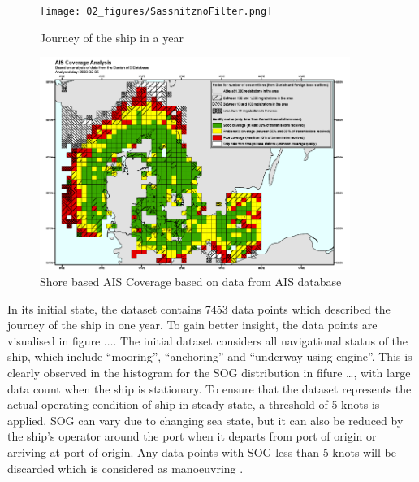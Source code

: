 \begin{figure}
    \centering
        \texttt{[image: 02\_figures/SassnitznoFilter.png]}
        \caption{Journey of the ship in a year}
        \label{fig:YearJourney}
\end{figure}

\begin{figure}
    \centering
        \includegraphics[width=0.9\textwidth]{02_figures/AIS_Coverage.png}
        \caption{Shore based AIS Coverage based on data from AIS database \cite{webaisdk.2023}}
        \label{fig:aiscoverage}
\end{figure}

In its initial state, the dataset contains 7453 data points which described the journey of the ship in one year. To gain better insight, the data points are visualised in figure $\dots$. The initial dataset considers all navigational status of the ship, which include ``mooring'', ``anchoring'' and ``underway using engine''. This is clearly observed in the histogram for the SOG distribution in fifure \dots, with large data count when the ship is stationary. To ensure that the dataset represents the actual operating condition of ship in steady state, a threshold of 5 knots is applied. SOG can vary due to changing sea state, but it can also be reduced by the ship's operator around the port when it departs from port of origin or arriving at port of origin. Any data points with SOG less than 5 knots will be discarded which is considered as manoeuvring \cite{Abebe.2020}.\\

